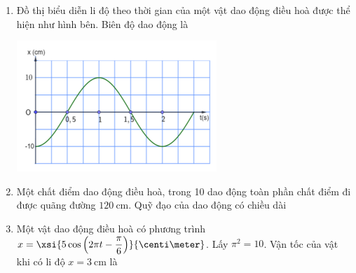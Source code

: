 \begin{enumerate}[label=\bfseries Câu \arabic*:]
\item Đồ thị biểu diễn li độ theo thời gian của một vật dao động điều hoà được thể hiện như hình bên. Biên độ dao động là
\begin{center}
	\includegraphics[width=0.4\linewidth]{../figs/C1-Q-2}
\end{center}

\item Một chất điểm dao động điều hoà, trong 10 dao động toàn phần chất điểm đi được quãng đường $\SI{120}{\centi\meter}$. Quỹ đạo của dao động có chiều dài

\item Một vật dao động điều hoà có phương trình $x=\xsi{5\cos\left(2\pi t-\dfrac{\pi}{6}\right)}{\centi\meter}$. Lấy $\pi^2=10$. Vận tốc của vật khi có li độ $x=\SI{3}{\centi\meter}$ là


\end{enumerate}
